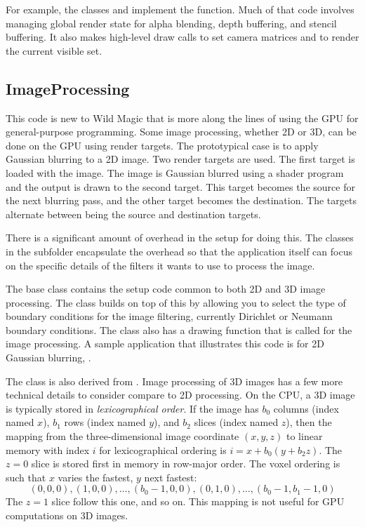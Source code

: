 \documentclass{article}
\begin{document}
For example, the classes  and
 implement the  function.  Much of that
code involves managing global render state for alpha blending, depth
buffering, and stencil buffering.  It also makes high-level draw calls
to set camera matrices and to render the current visible set.

\subsection{ImageProcessing}

This code is new to Wild Magic that is more along the lines of using the
GPU for general-purpose programming.  Some image processing, whether 2D or 3D,
can be done on the GPU using render targets.  The prototypical case is to
apply Gaussian blurring to a 2D image.  Two render targets are used.  The
first target is loaded with the image.  The image is Gaussian blurred using
a shader program and the output is drawn to the second target.  This target
becomes the source for the next blurring pass, and the other target becomes
the destination.  The targets alternate between being the source and
destination targets.

There is a significant amount of overhead in the setup for doing this.  The
classes in the  subfolder encapsulate the overhead
so that the application itself can focus on the specific details of the
filters it wants to use to process the image.

The base class  contains the setup code common to both
2D and 3D image processing.  The class  builds on top
of this by allowing you to select the type of boundary conditions for the
image filtering, currently Dirichlet or Neumann boundary conditions.  The
class also has a drawing function that is called for the image processing.
A sample application that illustrates this code is for 2D Gaussian blurring,
.

The class  is also derived from .
Image processing of 3D images has a few more technical details to consider
compare to 2D processing.  On the CPU, a 3D image is typically stored in
{\em lexicographical order}.  If the image has $b_0$ columns (index named
$x$), $b_1$ rows (index named $y$), and $b_2$ slices (index named $z$), then
the mapping from the three-dimensional image coordinate $(x,y,z)$ to linear
memory with index $i$ for lexicographical ordering is
$i = x + b_0 (y + b_2 z)$.  The $z = 0$ slice is stored first in memory in
row-major order.  The voxel ordering is such that $x$ varies the fastest,
$y$ next fastest:
\[
  (0,0,0), (1,0,0), \ldots, (b_0-1,0,0), (0,1,0), \ldots,
    (b_0-1, b_1-1, 0)
\]
The $z = 1$ slice follow this one, and so on.  This mapping is not useful for
GPU computations on 3D images.
\end{document}
